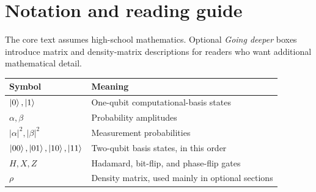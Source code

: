 \chapter*{Notation and reading guide}

The core text assumes high-school mathematics. Optional \emph{Going deeper} boxes
introduce matrix and density-matrix descriptions for readers who want additional
mathematical detail.

\begin{center}
\begin{tabular}{ll}
\toprule
Symbol & Meaning \\
\midrule
$\ket{0},\ket{1}$ & One-qubit computational-basis states \\
$\alpha,\beta$ & Probability amplitudes \\
$|\alpha|^2,|\beta|^2$ & Measurement probabilities \\
$\ket{00},\ket{01},\ket{10},\ket{11}$ & Two-qubit basis states, in this order \\
$H,X,Z$ & Hadamard, bit-flip, and phase-flip gates \\
$\rho$ & Density matrix, used mainly in optional sections \\
\bottomrule
\end{tabular}
\end{center}
